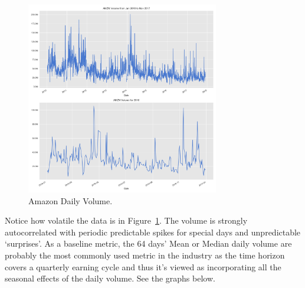 	\begin{figure}[!ht]
		\centering
			\includegraphics[width=0.75\textwidth]{chapters/chapter_trade_data_models/figures/daily_volume.png} 
		\caption{Amazon Daily Volume. \label{fig:daily_volume}}
	\end{figure}
	
Notice how volatile the data is in Figure~\ref{fig:daily_volume}. The volume is strongly autocorrelated with periodic predictable spikes for special days and unpredictable `surprises'. As a baseline metric, the 64 days' Mean or Median daily volume are probably the most commonly used metric in the industry as the time horizon covers a quarterly earning cycle and thus it's viewed as incorporating all the seasonal effects of the daily volume. See the graphs below.
	
